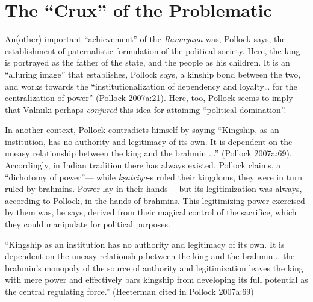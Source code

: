 \section{The “Crux” of the Problematic}\label{sec1.4}

An(other) important “achievement” of the {\sl Rāmāyaṇa} was, Pollock says, the establishment of paternalistic formulation of the political society. Here, the king is portrayed as the father of the state, and the people as his children. It is an “alluring image” that establishes, Pollock says, a kinship bond between the two, and works towards the “institutionalization of dependency and loyalty… for the centralization of power” (Pollock 2007a:21).  Here, too, Pollock seems to imply that Vālmīki perhaps {\sl conjured} this idea for attaining “political domination”. 

In another context, Pollock contradicts himself by saying “Kingship, as an institution, has no authority and legitimacy of its own. It is dependent on the uneasy relationship between the king and the brahmin ...” (Pollock 2007a:69). Accordingly, in Indian tradition there has always existed, Pollock claims, a “dichotomy of power”--- while {\sl kṣatriya}-s ruled their kingdoms, they were in turn ruled by brahmins.  Power lay in their hands--- but its legitimization was always, according to Pollock, in the hands of brahmins. This legitimizing power exercised by them was, he says, derived from their magical control of the sacrifice, which they could manipulate for political purposes.

\begin{myquote}
“Kingship as an institution has no authority and legitimacy of its own. It is dependent on the uneasy relationship between the king and the brahmin... the brahmin’s monopoly of the source of authority and legitimization leaves the king with mere power and effectively bars kingship from developing its full potential as the central regulating force.” 	
\hfill (Heeterman cited in Pollock 2007a:69)
\end{myquote}


